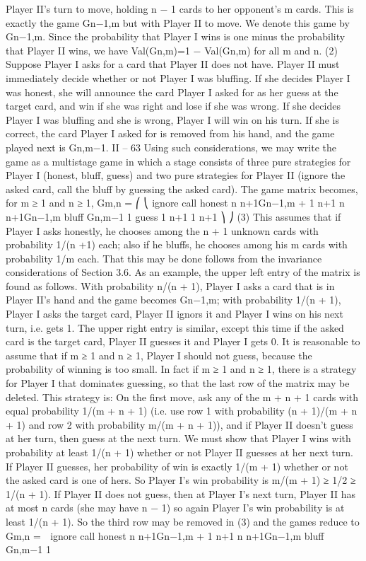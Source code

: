 Player II’s turn to move, holding n − 1 cards to her opponent’s m cards. This is exactly
the game Gn−1,m but with Player II to move. We denote this game by Gn−1,m. Since the
probability that Player I wins is one minus the probability that Player II wins, we have
Val(Gn,m)=1 − Val(Gn,m) for all m and n. (2)
Suppose Player I asks for a card that Player II does not have. Player II must immediately
decide whether or not Player I was bluffing. If she decides Player I was honest, she
will announce the card Player I asked for as her guess at the target card, and win if she
was right and lose if she was wrong. If she decides Player I was bluffing and she is wrong,
Player I will win on his turn. If she is correct, the card Player I asked for is removed from
his hand, and the game played next is Gn,m−1.
II – 63
Using such considerations, we may write the game as a multistage game in which
a stage consists of three pure strategies for Player I (honest, bluff, guess) and two pure
strategies for Player II (ignore the asked card, call the bluff by guessing the asked card).
The game matrix becomes, for m ≥ 1 and n ≥ 1,
Gm,n =
⎛
⎝
ignore call
honest n
n+1Gn−1,m + 1
n+1
n
n+1Gn−1,m
bluff Gn,m−1 1
guess 1
n+1
1
n+1
⎞
⎠ (3)
This assumes that if Player I asks honestly, he chooses among the n + 1 unknown
cards with probability 1/(n +1) each; also if he bluffs, he chooses among his m cards with
probability 1/m each. That this may be done follows from the invariance considerations
of Section 3.6.
As an example, the upper left entry of the matrix is found as follows. With probability
n/(n + 1), Player I asks a card that is in Player II’s hand and the game becomes Gn−1,m;
with probability 1/(n + 1), Player I asks the target card, Player II ignors it and Player I
wins on his next turn, i.e. gets 1. The upper right entry is similar, except this time if the
asked card is the target card, Player II guesses it and Player I gets 0.
It is reasonable to assume that if m ≥ 1 and n ≥ 1, Player I should not guess,
because the probability of winning is too small. In fact if m ≥ 1 and n ≥ 1, there is a
strategy for Player I that dominates guessing, so that the last row of the matrix may be
deleted. This strategy is: On the first move, ask any of the m + n + 1 cards with equal
probability 1/(m + n + 1) (i.e. use row 1 with probability (n + 1)/(m + n + 1) and row
2 with probability m/(m + n + 1)), and if Player II doesn’t guess at her turn, then guess
at the next turn. We must show that Player I wins with probability at least 1/(n + 1)
whether or not Player II guesses at her next turn. If Player II guesses, her probability of
win is exactly 1/(m + 1) whether or not the asked card is one of hers. So Player I’s win
probability is m/(m + 1) ≥ 1/2 ≥ 1/(n + 1). If Player II does not guess, then at Player
I’s next turn, Player II has at most n cards (she may have n − 1) so again Player I’s win
probability is at least 1/(n + 1).
So the third row may be removed in (3) and the games reduce to
Gm,n =

ignore call
honest n
n+1Gn−1,m + 1
n+1
n
n+1Gn−1,m
bluff Gn,m−1 1


